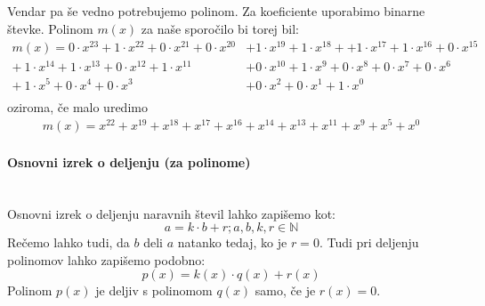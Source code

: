 \documentclass[12pt]{article}
\begin{document}
                Vendar pa še vedno potrebujemo polinom. Za koeficiente uporabimo
                binarne števke. Polinom $m(x)$ za naše sporočilo bi torej bil:
                \begin{equation}
                    \begin{split}
                        m(x) = 0 \cdot x^{23} + 1 \cdot x^{22} + 0 \cdot x^{21}
                        + 0 \cdot x^{20} & + 1 \cdot x^{19} + 1 \cdot x^{18} +
                        + 1 \cdot x^{17} + 1 \cdot x^{16} + 0 \cdot x^{15}\\
                        + \: 1 \cdot x^{14} + 1 \cdot x^{13} + 0 \cdot x^{12}
                        + 1 \cdot x^{11} & + 0  \cdot x^{10} + 1 \cdot x^{9}
                        + 0 \cdot x^{8} + 0 \cdot x^{7} + 0 \cdot x^{6} \\
                        + \:1 \cdot x^{5} + 0 \cdot x^{4} + 0 \cdot x^{3} &
                        + 0 \cdot x^{2} + 0 \cdot x^{1} + 1 \cdot x^{0}\\
                    \end{split}
                \end{equation}
                oziroma, če malo uredimo
                \begin{equation}
                    \begin{split}
                        m(x) = x^{22} + x^{19} + x^{18} + x^{17} + x^{16} +
                        x^{14} + x^{13} + x^{11} + x^{9} + x^{5} + x^{0}
                    \end{split}
                \end{equation}
            \paragraph{Osnovni izrek o deljenju (za polinome)} \mbox{}\\
                Osnovni izrek o deljenju naravnih števil lahko zapišemo kot:
                \begin{equation}
                    a = k \cdot b + r; a,b,k,r \in \mathbb{N}
                \end{equation}
                Rečemo lahko tudi, da $b$ deli $a$ natanko tedaj, ko je $r=0$.
                Tudi pri deljenju polinomov lahko zapišemo podobno:
                \begin{equation}
                    p(x) = k(x) \cdot q(x) + r(x)
                \end{equation}
                Polinom $p(x)$ je deljiv s polinomom $q(x)$ samo, če je 
                $r(x)=0$.
\end{document}
